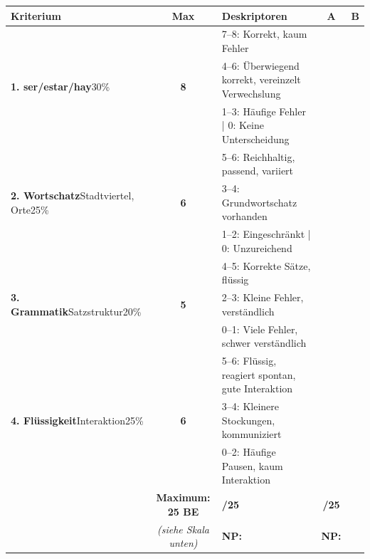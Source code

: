 \documentclass[11pt, a4paper]{article}
\begin{document}
\begin{tabular}{|p{3cm}|c|p{7cm}|c|c|}
\hline
\rowcolor{gruppeA!20}
\textbf{Kriterium} & \textbf{Max} & \textbf{Deskriptoren} & \textbf{A} & \textbf{B} \\
\hline
\hline
\multirow{3}{3cm}{\textbf{1. ser/estar/hay}\newline\scriptsize{30\%}}
& \multirow{3}{*}{\textbf{8}}
& \scriptsize{7--8: Korrekt, kaum Fehler} & & \\
& & \scriptsize{4--6: Überwiegend korrekt, vereinzelt Verwechslung} & & \\
& & \scriptsize{1--3: Häufige Fehler | 0: Keine Unterscheidung} & & \\
\hline
\multirow{3}{3cm}{\textbf{2. Wortschatz}\newline\scriptsize{Stadtviertel, Orte}\newline\scriptsize{25\%}}
& \multirow{3}{*}{\textbf{6}}
& \scriptsize{5--6: Reichhaltig, passend, variiert} & & \\
& & \scriptsize{3--4: Grundwortschatz vorhanden} & & \\
& & \scriptsize{1--2: Eingeschränkt | 0: Unzureichend} & & \\
\hline
\multirow{3}{3cm}{\textbf{3. Grammatik}\newline\scriptsize{Satzstruktur}\newline\scriptsize{20\%}}
& \multirow{3}{*}{\textbf{5}}
& \scriptsize{4--5: Korrekte Sätze, flüssig} & & \\
& & \scriptsize{2--3: Kleine Fehler, verständlich} & & \\
& & \scriptsize{0--1: Viele Fehler, schwer verständlich} & & \\
\hline
\multirow{3}{3cm}{\textbf{4. Flüssigkeit}\newline\scriptsize{Interaktion}\newline\scriptsize{25\%}}
& \multirow{3}{*}{\textbf{6}}
& \scriptsize{5--6: Flüssig, reagiert spontan, gute Interaktion} & & \\
& & \scriptsize{3--4: Kleinere Stockungen, kommuniziert} & & \\
& & \scriptsize{0--2: Häufige Pausen, kaum Interaktion} & & \\
\hline
\rowcolor{hellgrau}
\multicolumn{2}{|c|}{\textbf{SUMME}} & \textbf{Maximum: 25 BE} & \textbf{/25} & \textbf{/25} \\
\hline
\rowcolor{yellow!20}
\multicolumn{2}{|c|}{\textbf{NOTENPUNKTE}} & \textit{(siehe Skala unten)} & \textbf{NP:} & \textbf{NP:} \\
\hline
\end{tabular}
\end{document}
